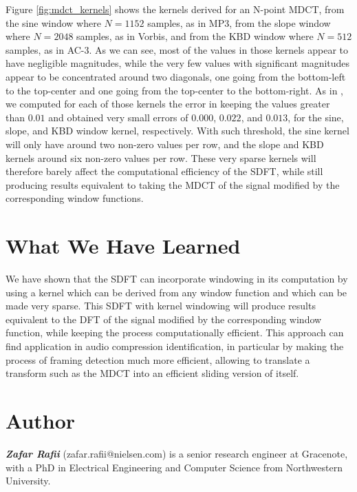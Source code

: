 \documentclass[journal]{IEEEtran}
\begin{document}
Figure \ref{fig:mdct_kernels} shows the kernels derived for an N-point MDCT, from the sine window where $N = 1152$ samples, as in MP3, from the slope window where $N = 2048$ samples, as in Vorbis, and from the KBD window where $N = 512$ samples, as in AC-3. As we can see, most of the values in those kernels appear to have negligible magnitudes, while the very few values with significant magnitudes appear to be concentrated around two diagonals, one going from the bottom-left to the top-center and one going from the top-center to the bottom-right. As in \cite{brown1992}, we computed for each of those kernels the error in keeping the values greater than $0.01$ and obtained very small errors of $0.000$, $0.022$, and $0.013$, for the sine, slope, and KBD window kernel, respectively. With such threshold, the sine kernel will only have around two non-zero values per row, and the slope and KBD kernels around six non-zero values per row. These very sparse kernels will therefore barely affect the computational efficiency of the SDFT, while still producing results equivalent to taking the MDCT of the signal modified by the corresponding window functions.


\section{What We Have Learned}

We have shown that the SDFT can incorporate windowing in its computation by using a kernel which can be derived from any window function and which can be made very sparse. This SDFT with kernel windowing will produce results equivalent to the DFT of the signal modified by the corresponding window function, while keeping the process computationally efficient. This approach can find application in audio compression identification, in particular by making the process of framing detection much more efficient, allowing to translate a transform such as the MDCT into an efficient sliding version of itself.

\section{Author}

\textit{\textbf{Zafar Rafii}} (zafar.rafii@nielsen.com) is a senior research engineer at Gracenote, with a PhD in Electrical Engineering and Computer Science from Northwestern University.




\end{document}
